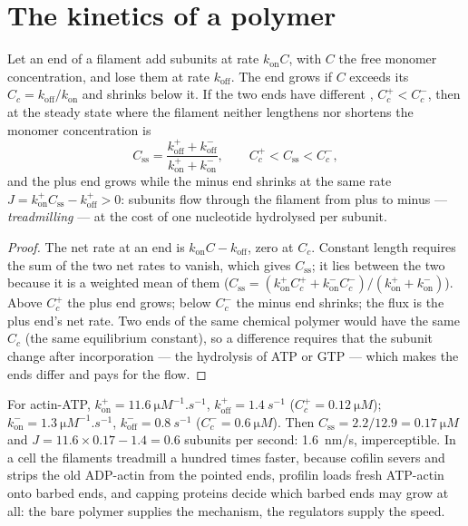 \section{The kinetics of a polymer}

\begin{theorem}\label{thm:b3:cytoskeleton-motility:treadmilling}
Let an end of a filament add subunits at rate $k_{\text{on}}C$, with
$C$ the free monomer concentration, and lose them at rate
$k_{\text{off}}$. The end grows if $C$ exceeds its \emph{} $C_{c} = k_{\text{off}}/k_{\text{on}}$ and shrinks below
it. If the two ends have different , $C_{c}^{+}
< C_{c}^{-}$, then at the steady state where the filament neither
lengthens nor shortens the monomer concentration is
\[
C_{\text{ss}} = \frac{k_{\text{off}}^{+} + k_{\text{off}}^{-}}
{k_{\text{on}}^{+} + k_{\text{on}}^{-}},
\qquad C_{c}^{+} < C_{\text{ss}} < C_{c}^{-},
\]
and the plus end grows while the minus end shrinks at the same rate
$J = k_{\text{on}}^{+}C_{\text{ss}} - k_{\text{off}}^{+} > 0$: subunits
flow through the filament from plus to minus --- \emph{treadmilling}
--- at the cost of one nucleotide hydrolysed per subunit.
\end{theorem}
\begin{proof}
The net rate at an end is $k_{\text{on}}C - k_{\text{off}}$, zero at
$C_{c}$. Constant length requires the sum of the two net rates to
vanish, which gives $C_{\text{ss}}$; it lies between the two  because it is a weighted mean of them ($C_{\text{ss}} =
(k_{\text{on}}^{+}C_{c}^{+} + k_{\text{on}}^{-}C_{c}^{-})/(k_{\text{on}}^{+}
+ k_{\text{on}}^{-})$). Above $C_{c}^{+}$ the plus end grows; below
$C_{c}^{-}$ the minus end shrinks; the flux is the plus end's net rate.
Two ends of the same chemical polymer would have the same $C_{c}$ (the
same equilibrium constant), so a difference requires that the subunit
change after incorporation --- the hydrolysis of ATP or GTP --- which
makes the ends differ and pays for the flow.
\end{proof}

\begin{example}\label{ex:b3:cytoskeleton-motility:actin-numbers}
For actin-ATP, $k_{\text{on}}^{+} = \qty{11.6}{\micro M^{-1}.s^{-1}}$,
$k_{\text{off}}^{+} = \qty{1.4}{s^{-1}}$ ($C_{c}^{+} = \qty{0.12}{\micro
M}$); $k_{\text{on}}^{-} = \qty{1.3}{\micro M^{-1}.s^{-1}}$,
$k_{\text{off}}^{-} = \qty{0.8}{s^{-1}}$ ($C_{c}^{-} = \qty{0.6}{\micro
M}$). Then $C_{\text{ss}} = 2.2/12.9 = \qty{0.17}{\micro M}$ and $J =
11.6\times 0.17 - 1.4 = 0.6$ subunits per second: \qty{1.6}{nm/s},
imperceptible. In a cell the filaments treadmill a hundred times
faster, because cofilin severs and strips the old ADP-actin from the
pointed ends, profilin loads fresh ATP-actin onto barbed ends, and
capping proteins decide which barbed ends may grow at all: the bare
polymer supplies the mechanism, the regulators supply the speed.
\end{example}

